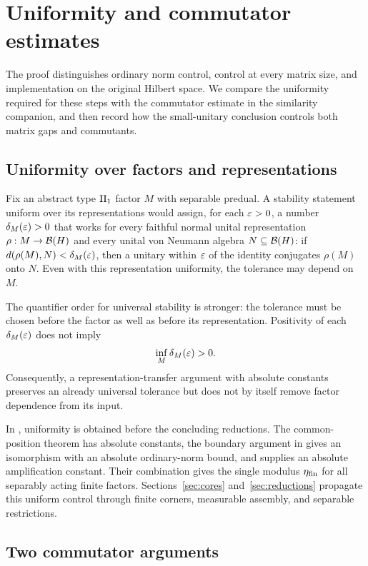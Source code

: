 \section{Uniformity and commutator estimates}
\label{app:comparison}

The proof distinguishes ordinary norm control, control at every matrix
size, and implementation on the original Hilbert space. We compare the
uniformity required for these steps with the commutator estimate in the
similarity companion, and then record how the small-unitary conclusion
controls both matrix gaps and commutants.

\subsection{Uniformity over factors and representations}

Fix an abstract type $\mathrm{II}_1$ factor $M$ with separable predual.
A stability statement uniform over its representations would assign,
for each $\varepsilon>0$, a number $\delta_M(\varepsilon)>0$ that works for every
faithful normal unital representation $\rho:M\to\mathcal B(H)$ and every
unital von Neumann algebra $N\subseteq\mathcal B(H)$: if
$d(\rho(M),N)<\delta_M(\varepsilon)$, then a unitary within $\varepsilon$ of the
identity conjugates $\rho(M)$ onto $N$. Even with this representation
uniformity, the tolerance may depend on $M$.

The quantifier order for universal stability is stronger:
the tolerance must be chosen before the factor as well as before its
representation. Positivity of each $\delta_M(\varepsilon)$ does not imply
\[
 \inf_M\delta_M(\varepsilon)>0.
\]
Consequently, a representation-transfer argument with absolute constants
preserves an already universal tolerance but does not by itself remove
factor dependence from its input.

In , uniformity is obtained before the concluding
reductions. The common-position theorem has absolute constants, the
boundary argument in  gives an
isomorphism with an absolute ordinary-norm bound, and
 supplies an absolute amplification constant.
Their combination gives the single modulus $\eta_{\rm fin}$ for all
separably acting finite factors. Sections~\ref{sec:cores}
and~\ref{sec:reductions} propagate this uniform control through finite
corners, measurable assembly, and separable restrictions.

\subsection{Two commutator arguments}

